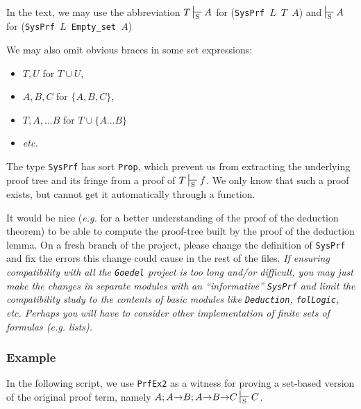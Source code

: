 In the text, we may use the abbreviation $T \sdash A$ for
(\texttt{SysPrf $L$ $T$ $A$}) and
$\sdash A$ for
(\texttt{SysPrf $L$ Empty\_set $A$}) 



We may also omit obvious braces in some set expressions:


\begin{itemize}

\item $T,U$ for $T \cup U$,
\item $A, B, C$ for $\{A, B, C\}$,
\item $T, A,\dots B$ for $T \cup\{A \dots B\}$
\item \emph{etc.}
\end{itemize}




\begin{remark}
  The type \texttt{SysPrf} has sort \texttt{Prop}, which prevent us from
extracting the underlying proof tree and its fringe from a proof of $T\sdash f$. We only know that such a proof exists, but cannot get it automatically through a \coq function.
\end{remark}



\begin{project}
It would be nice (\emph{e.g.} for a better understanding of the proof of the deduction theorem) to be able to compute the  proof-tree built
by the proof of the deduction lemma. 
On a fresh branch of the project, please change the definition of
\texttt{SysPrf} and fix the errors this change could cause in the rest of the files. 
\emph{If ensuring compatibility with all the \texttt{Goedel} project is too long and/or difficult, you may just make the changes in separate modules with an ``informative'' \texttt{SysPrf} and limit the compatibility study  to the contents of basic modules like
\texttt{Deduction}, \texttt{folLogic}, etc.
Perhaps you will have to consider other implementation of finite sets of formulas (\emph{e.g.} lists).
}

\end{project}





\subsubsection{Example}


In the following script, we use \texttt{PrfEx2}
as a witness for proving a set-based version of the 
original proof term, namely $A; A \arrow B; A \arrow B \arrow C \sdash C$.



